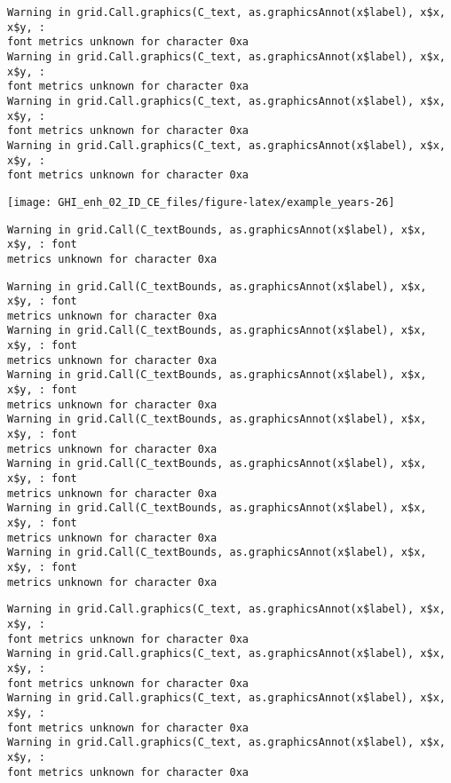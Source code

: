 \documentclass[
  10pt,
  a4paper,oneside]{article}
\begin{document}
\begin{verbatim}
Warning in grid.Call.graphics(C_text, as.graphicsAnnot(x$label), x$x, x$y, :
font metrics unknown for character 0xa
Warning in grid.Call.graphics(C_text, as.graphicsAnnot(x$label), x$x, x$y, :
font metrics unknown for character 0xa
Warning in grid.Call.graphics(C_text, as.graphicsAnnot(x$label), x$x, x$y, :
font metrics unknown for character 0xa
Warning in grid.Call.graphics(C_text, as.graphicsAnnot(x$label), x$x, x$y, :
font metrics unknown for character 0xa
\end{verbatim}

\begin{center}\texttt{[image: GHI\_enh\_02\_ID\_CE\_files/figure-latex/example\_years-26]} \end{center}

\begin{verbatim}
Warning in grid.Call(C_textBounds, as.graphicsAnnot(x$label), x$x, x$y, : font
metrics unknown for character 0xa
\end{verbatim}

\begin{verbatim}
Warning in grid.Call(C_textBounds, as.graphicsAnnot(x$label), x$x, x$y, : font
metrics unknown for character 0xa
Warning in grid.Call(C_textBounds, as.graphicsAnnot(x$label), x$x, x$y, : font
metrics unknown for character 0xa
Warning in grid.Call(C_textBounds, as.graphicsAnnot(x$label), x$x, x$y, : font
metrics unknown for character 0xa
Warning in grid.Call(C_textBounds, as.graphicsAnnot(x$label), x$x, x$y, : font
metrics unknown for character 0xa
Warning in grid.Call(C_textBounds, as.graphicsAnnot(x$label), x$x, x$y, : font
metrics unknown for character 0xa
Warning in grid.Call(C_textBounds, as.graphicsAnnot(x$label), x$x, x$y, : font
metrics unknown for character 0xa
Warning in grid.Call(C_textBounds, as.graphicsAnnot(x$label), x$x, x$y, : font
metrics unknown for character 0xa
\end{verbatim}

\begin{verbatim}
Warning in grid.Call.graphics(C_text, as.graphicsAnnot(x$label), x$x, x$y, :
font metrics unknown for character 0xa
Warning in grid.Call.graphics(C_text, as.graphicsAnnot(x$label), x$x, x$y, :
font metrics unknown for character 0xa
Warning in grid.Call.graphics(C_text, as.graphicsAnnot(x$label), x$x, x$y, :
font metrics unknown for character 0xa
Warning in grid.Call.graphics(C_text, as.graphicsAnnot(x$label), x$x, x$y, :
font metrics unknown for character 0xa
\end{verbatim}
\end{document}
